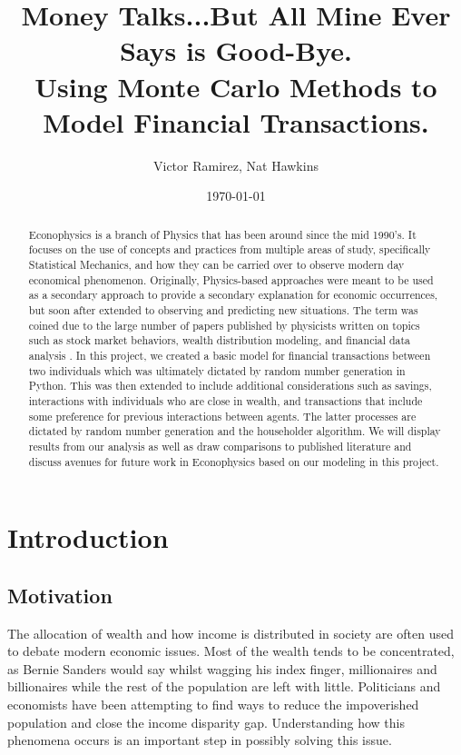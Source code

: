 \documentclass[11pt]{article}
\title{Money Talks...But All Mine Ever Says is Good-Bye.\\ Using Monte Carlo Methods to Model Financial Transactions.}
\author{Victor Ramirez, Nat Hawkins}
\date{\today}
\begin{document}
\maketitle
\begin{abstract}
	Econophysics is a branch of Physics that has been around since the mid 1990's. It focuses on the use of concepts and practices from multiple areas of study, specifically Statistical Mechanics, and how they can be carried over to observe modern day economical phenomenon. Originally, Physics-based approaches were meant to be used as a secondary approach to provide a secondary explanation for economic occurrences, but soon after extended to observing and predicting new situations. The term was coined due to the large number of papers published by physicists written on topics such as stock market behaviors, wealth distribution modeling, and financial data analysis \cite{wikipedia}. In this project, we created a basic model for financial transactions between two individuals which was ultimately dictated by random number generation in Python. This was then extended to include additional considerations such as savings, interactions with individuals who are close in wealth, and transactions that include some preference for previous interactions between agents. The latter processes are dictated by random number generation and the householder algorithm. We will display results from our analysis as well as draw comparisons to published literature and discuss avenues for future work in Econophysics based on our modeling in this project. 
\end{abstract}
\newpage

\section{Introduction}


\subsection{Motivation}
The allocation of wealth and how income is distributed in society are often used to debate modern economic issues. Most of the wealth tends to be concentrated, as Bernie Sanders would say whilst wagging his index finger, millionaires and billionaires while the rest of the population are left with little. Politicians and economists have been attempting to find ways to reduce the impoverished population and close the income disparity gap. Understanding how this phenomena occurs is an important step in possibly solving this issue.
\end{document}
